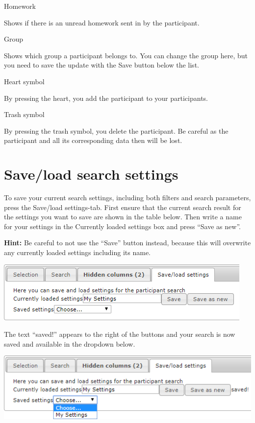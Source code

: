 \documentclass[]{book}
\begin{document}
Homework

Shows if there is an unread homework sent in by the participant.

Group

Shows which group a participant belongs to. You can change the group here, but you need to save the update with the Save button below the list.

Heart symbol

By pressing the heart, you add the participant to your participants.

Trash symbol

By pressing the trash symbol, you delete the participant. Be careful as the participant and all its corresponding data then will be lost.

\hypertarget{saveload-search-settings}{%
\section{Save/load search settings}\label{saveload-search-settings}}

To save your current search settings, including both filters and search parameters, press the Save/load settings-tab. First ensure that the current search result for the settings you want to save are shown in the table below. Then write a name for your settings in the Currently loaded settings box and press ``Save as new''.

\textbf{Hint:} Be careful to not use the ``Save'' button instead, because this will overwrite any currently loaded settings including its name.

\includegraphics{images/save-load1.png}

The text ``saved!'' appears to the right of the buttons and your search is now saved and available in the dropdown below.

\includegraphics{images/save-load2.png}
\end{document}
